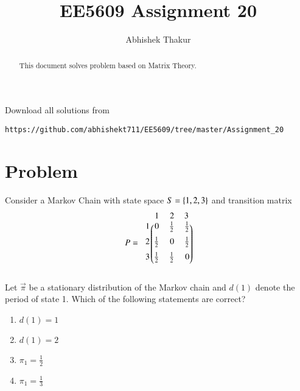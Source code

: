 \documentclass[journal,12pt,twocolumn]{IEEEtran}
\begin{document}
     \def\rightbox#1{\makebox[0in][r]{#1}}
     \def\centbox#1{\makebox[0in]{#1}}
     \def\topbox#1{\raisebox{-\baselineskip}[0in][0in]{#1}}
     \def\midbox#1{\raisebox{-0.5\baselineskip}[0in][0in]{#1}}
\vspace{3cm}
\title{EE5609 Assignment 20}
\author{Abhishek Thakur}
\maketitle
\bigskip
\renewcommand{\thefigure}{\theenumi}
\renewcommand{\thetable}{\theenumi}
\renewcommand{\labelenumi}{\alph{enumi})}
\begin{abstract}
This document solves problem based on Matrix Theory.
\end{abstract}
Download all solutions from 
\begin{lstlisting}
https://github.com/abhishekt711/EE5609/tree/master/Assignment_20
\end{lstlisting}
\section{Problem}
Consider a Markov Chain with state space $S = \left\{1,2, 3\right\}$ and transition matrix
\begin{align} \nonumber
P = 
\begin{blockarray}{c@{\hspace{1pt}}rrr@{\hspace{3pt}}}
            & 1   & 2 & 3 \\
        \begin{block}{r@{\hspace{3pt}}@{\hspace{1pt}}
    (@{\hspace{1pt}}rrr@{\hspace{1pt}}@{\hspace{1pt}})}
        1 &  0 & \frac{1}{2} & \frac{1}{2}   \\ [2mm]
        2 & \frac{1}{2}  & 0 & \frac{1}{2}\\ [2mm]
        3 & \frac{1}{2}  &  \frac{1}{2} & 0  \\ [2mm]
%
        \end{block}
    \end{blockarray}
\end{align}
%
Let $\vec{\pi}$ be a stationary distribution of the Markov chain and $d(1)$ denote the
period of state 1.  Which of the following statements are correct?
\begin{enumerate}
\item $d(1) = 1$
\item $d(1) = 2$
\item $\pi_1 = \frac{1}{2}$
\item $\pi_1 = \frac{1}{3}$
\end{enumerate}
\end{document}

